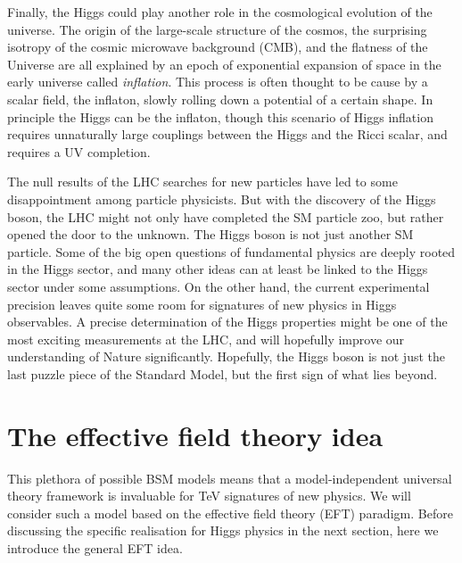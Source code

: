 Finally, the Higgs could play another role in the cosmological
evolution of the universe. The origin of the large-scale structure of
the cosmos, the surprising isotropy of the cosmic microwave background
(CMB), and the flatness of the Universe are all explained by an epoch
of exponential expansion of space in the early universe called
\emph{inflation}. This process is often thought to be cause by a
scalar field, the inflaton, slowly rolling down a potential of a
certain shape. In principle the Higgs can be the inflaton, though this
scenario of Higgs inflation requires unnaturally large couplings
between the Higgs and the Ricci scalar, and requires a UV completion.

\newparagraph
%
The null results of the LHC searches for new particles have led to
some disappointment among particle physicists. But with the discovery
of the Higgs boson, the LHC might not only have completed the SM
particle zoo, but rather opened the door to the unknown.  The Higgs
boson is not just another SM particle.  Some of the big open questions
of fundamental physics are deeply rooted in the Higgs sector, and many
other ideas can at least be linked to the Higgs sector under some
assumptions. On the other hand, the current experimental precision
leaves quite some room for signatures of new physics in Higgs
observables. A precise determination of the Higgs properties might be
one of the most exciting measurements at the LHC, and will hopefully
improve our understanding of Nature significantly. Hopefully, the
Higgs boson is not just the last puzzle piece of the Standard Model,
but the first sign of what lies beyond.



\section{The effective field theory idea}
\label{sec:foundations_eft}


This plethora of possible BSM models means that a model-independent
universal theory framework is invaluable for TeV signatures of new
physics. We will consider such a model based on the effective field
theory (EFT) paradigm. Before discussing the specific realisation for
Higgs physics in the next section, here we introduce the general EFT idea.

